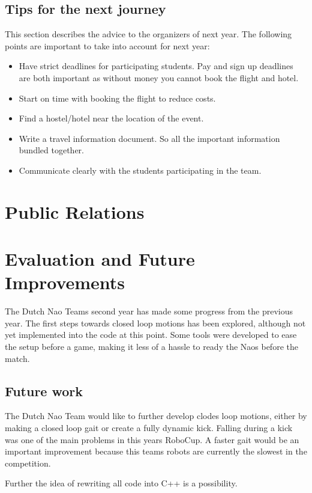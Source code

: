 \documentclass[a4paper]{article}
\begin{document}
\subsection{Tips for the next journey}
This section describes the advice to the organizers of next year. The following points are important to take into account for next year:
\begin{itemize}
\item Have strict deadlines for participating students. Pay and sign up deadlines are both important as without money you cannot book the flight and hotel.
\item Start on time with booking the flight to reduce costs.
\item Find a hostel/hotel near the location of the event.
\item Write a travel information document. So all the important information bundled together.
\item Communicate clearly with the students participating in the team.
\end{itemize}

\section{Public Relations}




\section{Evaluation and Future Improvements}

The Dutch Nao Teams second year has made some progress from the previous year. The first steps towards closed loop motions has been explored, although not yet implemented into the code at this point. Some tools were developed to ease the setup before a game, making it less of a hassle to ready the Naos before the match.

\subsection{Future work}
The Dutch Nao Team would like to further develop clodes loop motions, either by making a closed loop gait or create a fully dynamic kick. Falling during a kick was one of the main problems in this years RoboCup. A faster gait would be an important improvement because this teams robots are currently the slowest in the competition.

Further the idea of rewriting all code into C++ is a possibility.
\end{document}
